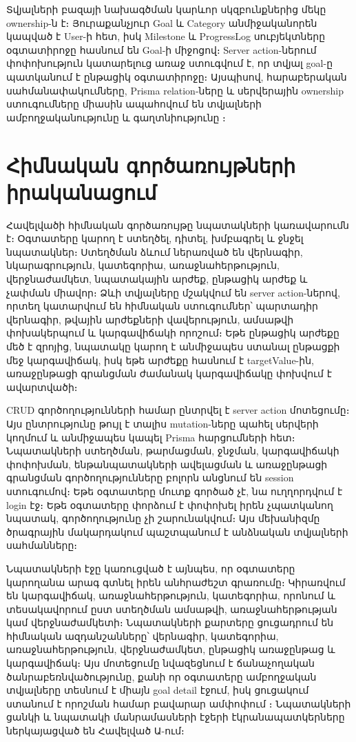 Տվյալների բազայի նախագծման կարևոր սկզբունքներից մեկը ownership-ն է։ Յուրաքանչյուր Goal և Category անմիջականորեն կապված է User-ի հետ, իսկ Milestone և ProgressLog սուբյեկտները օգտատիրոջը հասնում են Goal-ի միջոցով։ Server action-ներում փոփոխություն կատարելուց առաջ ստուգվում է, որ տվյալ goal-ը պատկանում է ընթացիկ օգտատիրոջը։ Այսպիսով, հարաբերական սահմանափակումները, Prisma relation-ները և սերվերային ownership ստուգումները միասին ապահովում են տվյալների ամբողջականությունը և գաղտնիությունը \autocite{date2004introduction,prismaDocsRelations}։

\section{Հիմնական գործառույթների իրականացում}

Հավելվածի հիմնական գործառույթը նպատակների կառավարումն է։ Օգտատերը կարող է ստեղծել, դիտել, խմբագրել և ջնջել նպատակներ։ Ստեղծման ձևում ներառված են վերնագիր, նկարագրություն, կատեգորիա, առաջնահերթություն, վերջնաժամկետ, նպատակային արժեք, ընթացիկ արժեք և չափման միավոր։ Ձևի տվյալները մշակվում են server action-ներով, որտեղ կատարվում են հիմնական ստուգումներ՝ պարտադիր վերնագիր, թվային արժեքների վավերություն, ամսաթվի փոխակերպում և կարգավիճակի որոշում։ Եթե ընթացիկ արժեքը մեծ է զրոյից, նպատակը կարող է անմիջապես ստանալ ընթացքի մեջ կարգավիճակ, իսկ եթե արժեքը հասնում է targetValue-ին, առաջընթացի գրանցման ժամանակ կարգավիճակը փոխվում է ավարտվածի։

CRUD գործողությունների համար ընտրվել է server action մոտեցումը։ Այս ընտրությունը թույլ է տալիս mutation-ները պահել սերվերի կողմում և անմիջապես կապել Prisma հարցումների հետ։ Նպատակների ստեղծման, թարմացման, ջնջման, կարգավիճակի փոփոխման, ենթանպատակների ավելացման և առաջընթացի գրանցման գործողությունները բոլորն անցնում են session ստուգումով։ Եթե օգտատերը մուտք գործած չէ, նա ուղղորդվում է login էջ։ Եթե օգտատերը փորձում է փոփոխել իրեն չպատկանող նպատակ, գործողությունը չի շարունակվում։ Այս մեխանիզմը ծրագրային մակարդակում պաշտպանում է անձնական տվյալների սահմանները։

Նպատակների էջը կառուցված է այնպես, որ օգտատերը կարողանա արագ գտնել իրեն անհրաժեշտ գրառումը։ Կիրառվում են կարգավիճակ, առաջնահերթություն, կատեգորիա, որոնում և տեսակավորում ըստ ստեղծման ամսաթվի, առաջնահերթության կամ վերջնաժամկետի։ Նպատակների քարտերը ցուցադրում են հիմնական ազդանշանները՝ վերնագիր, կատեգորիա, առաջնահերթություն, վերջնաժամկետ, ընթացիկ առաջընթաց և կարգավիճակ։ Այս մոտեցումը նվազեցնում է ճանաչողական ծանրաբեռնվածությունը, քանի որ օգտատերը ամբողջական տվյալները տեսնում է միայն goal detail էջում, իսկ ցուցակում ստանում է որոշման համար բավարար ամփոփում \autocite{norman2013design,nielsen2012usability}։ Նպատակների ցանկի և նպատակի մանրամասների էջերի էկրանապատկերները ներկայացված են Հավելված Ա-ում։

